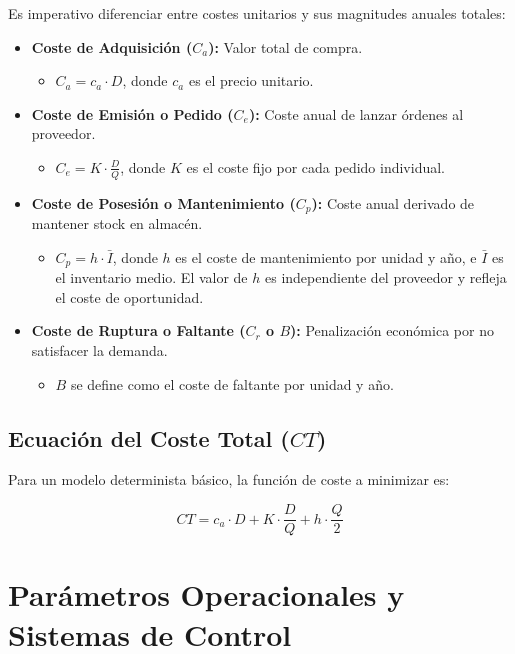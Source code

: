 \documentclass[11pt,a4paper]{article}
\begin{document}
Es imperativo diferenciar entre costes unitarios y sus magnitudes anuales totales:

\begin{itemize}
    \item \textbf{Coste de Adquisición ($C_a$):} Valor total de compra.
          \begin{itemize}
              \item $C_a = c_a \cdot D$, donde $c_a$ es el precio unitario.
          \end{itemize}
    \item \textbf{Coste de Emisión o Pedido ($C_e$):} Coste anual de lanzar órdenes al proveedor.
          \begin{itemize}
              \item $C_e = K \cdot \frac{D}{Q}$, donde $K$ es el coste fijo por cada pedido individual.
          \end{itemize}
    \item \textbf{Coste de Posesión o Mantenimiento ($C_p$):} Coste anual derivado de mantener stock en almacén.
          \begin{itemize}
              \item $C_p = h \cdot \bar{I}$, donde $h$ es el coste de mantenimiento por unidad y año, e $\bar{I}$ es el inventario medio. El valor de $h$ es independiente del proveedor y refleja el coste de oportunidad.
          \end{itemize}
    \item \textbf{Coste de Ruptura o Faltante ($C_r$ o $B$):} Penalización económica por no satisfacer la demanda.
          \begin{itemize}
              \item $B$ se define como el coste de faltante por unidad y año.

          \end{itemize}
\end{itemize}
\subsection{Ecuación del Coste Total ($CT$)}

Para un modelo determinista básico, la función de coste a minimizar es:

\[
    CT = c_a \cdot D + K \cdot \frac{D}{Q} + h \cdot \frac{Q}{2}
\]

\section{Parámetros Operacionales y Sistemas de Control}
\end{document}
